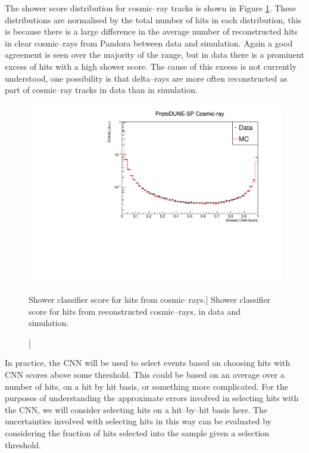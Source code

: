 The shower score distribution for cosmic--ray tracks is shown in Figure
\ref{fig:cosmic_muon_cnn}. These distributions are normalised by the total
number of hits in each distribution, this is because there is a large difference
in the average number of reconstructed hits in clear cosmic--rays from Pandora
between data and simulation. Again a good agreement is seen over the majority 
of the range, but in data there is a prominent excess of hits with a high 
shower score. The cause of this excess is not currently understood, one
possibility is that delta--rays are more often reconstructed as part of
cosmic--ray tracks in data than in simulation.

\begin{figure}
	\centering
	\includegraphics[width=\textwidth]{figures/hit_cnn_cosmics.pdf}
	\caption
	[Shower classifier score for hits from cosmic--rays.]
	{Shower classifier score for hits from reconstructed cosmic--rays, in data and
	simulation.}
	\label{fig:cosmic_muon_cnn}
\end{figure}

\bigskip
\noindent
In practice, the CNN will be used to select events based on choosing hits with 
CNN scores above some threshold. This could be based on an average over a 
number of hits, on a hit by hit basis, or something more complicated. For the
purposes of understanding the approximate errors involved in selecting hits with
the CNN, we will consider selecting hits on a hit--by--hit basis here.  The 
uncertainties involved with selecting hits in this way can be evaluated by 
considering the fraction of hits selected into the sample given a selection 
threshold. 

